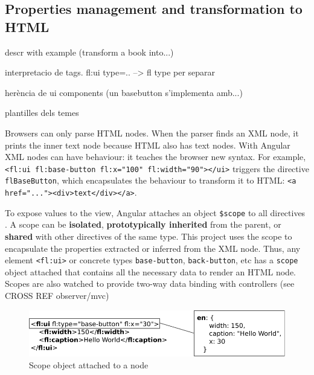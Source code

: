 \subsection{Properties management and transformation to \ac{HTML}}
descr with example (transform a  book into...)

interpretacio de tags. fl:ui type=.. --> fl {type} per separar

herència de ui components (un basebutton s'implementa amb...)

plantilles dels temes

Browsers can only parse \ac{HTML} nodes.
When the parser finds an \ac{XML} node, it prints the inner text node because \ac{HTML} also has text nodes.
With Angular \ac{XML} nodes can have behaviour: it teaches the browser new syntax.
For example, \lstinline$<fl:ui fl:base-button fl:x="100" fl:width="90"></ui>$ triggers the directive \lstinline$flBaseButton$, which encapsulates the behaviour to transform it to \ac{HTML}: \lstinline$<a href="..."><div>text</div></a>$.

To expose values to the view, Angular attaches an object \texttt{\$scope} to all directives  .
A scope can be \textbf{isolated}, \textbf{prototypically inherited} from the parent, or \textbf{shared} with other directives of the same type.
This project uses the scope to encapsulate the properties extracted or inferred from the \ac{XML} node.
Thus, any element \lstinline$<fl:ui>$ or concrete types \lstinline$base-button$, \lstinline$back-button$, etc has a \texttt{scope} object attached that contains all the necessary data to render an \ac{HTML} node.
Scopes are also watched to provide two-way data binding with controllers (see CROSS REF observer/mvc)

\begin{figure}[h]
    \centering
    \includegraphics{figures/design/properties-management.pdf}
    \caption{Scope object attached to a node}
    \label{fig:design-properties-management}
\end{figure}




